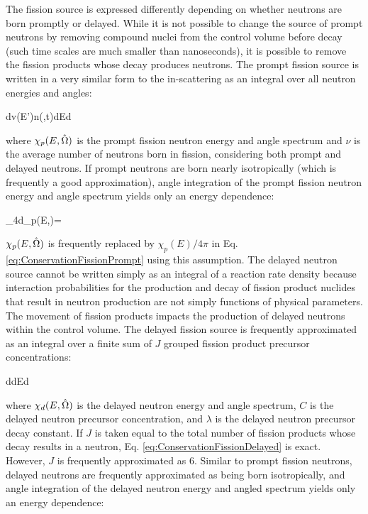 \beq
\label{eq:BetaDef}
\beta\equiv{}
\eeq

The fission source is expressed differently depending on whether neutrons are born promptly or delayed. While it is not possible to change the source of prompt neutrons by removing compound nuclei from the control volume before decay (such time scales are much smaller than nanoseconds), it is possible to remove the fission products whose decay produces neutrons. The prompt fission source is written in a very similar form to the in-scattering as an integral over all neutron energies and angles:

\beq
\label{eq:ConservationFissionPrompt}
\left\lbrack\int d\volume\promptfissionsource v(E')n(,t)\right\rbrack dEd\hO
\eeq

where \(\chi_p(E,\hat{\Omega})\) is the prompt fission neutron energy and angle spectrum and \(\nu\) is the average number of neutrons born in fission, considering both prompt and delayed neutrons. If prompt neutrons are born nearly isotropically (which is frequently a good approximation), angle integration of the prompt fission neutron energy and angle spectrum yields only an energy dependence:

\beq
\label{eq:prompt_isotropic}
\int_{4\pi}d\hO \chi_p(E,\hO)=
\eeq

\(\chi_p(E,\hat{\Omega})\) is frequently replaced by \(\chi_p(E)/4\pi\) in Eq. \eqref{eq:ConservationFissionPrompt} using this assumption. The delayed neutron source cannot be written simply as an integral of a reaction rate density because interaction probabilities for the production and decay of fission product nuclides that result in neutron production are not simply functions of physical parameters. The movement of fission products impacts the production of delayed neutrons within the control volume. The delayed fission source is frequently approximated as an integral over a finite sum of \(J\) grouped fission product precursor concentrations:

\beq
\label{eq:ConservationFissionDelayed}
\left\lbrack\int d\volume \delayedfissionsource\right\rbrack dEd\hO  
\eeq

where \(\chi_d(E,\hat{\Omega})\) is the delayed neutron energy and angle spectrum, \(C\) is the delayed neutron precursor concentration, and \(\lambda\) is the delayed neutron precursor decay constant. If \(J\) is taken equal to the total number of fission products whose decay results in a neutron, Eq. \eqref{eq:ConservationFissionDelayed} is exact. However, \(J\) is frequently approximated as 6. Similar to prompt fission neutrons, delayed neutrons are frequently approximated as being born isotropically, and angle integration of the delayed neutron energy and angled spectrum yields only an energy dependence:

